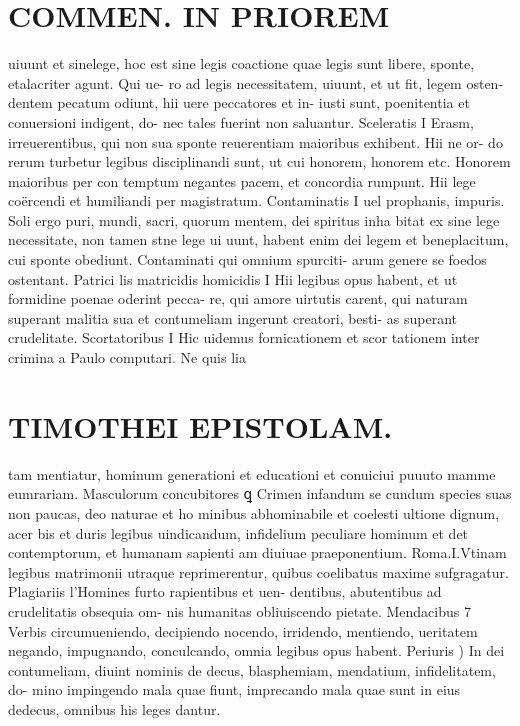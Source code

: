 \documentclass{article}
\begin{document}
\begin{pages}
\section*{COMMEN. IN PRIOREM }
\marginpar{[ p.20 ]}\pstart uiuunt et sinelege, hoc est sine legis coactione quae legis sunt libere, sponte, etalacriter agunt. Qui ue- ro ad legis necessitatem, uiuunt, et ut fit, legem osten- dentem pecatum odiunt, hii uere peccatores et in- iusti sunt, poenitentia et conuersioni indigent, do- nec tales fuerint non saluantur.  \pend\pstart Sceleratis I Erasm, irreuerentibus, qui non sua sponte reuerentiam maioribus exhibent. Hii ne or- do rerum turbetur legibus disciplinandi sunt, ut cui honorem, honorem etc. Honorem maioribus per con temptum negantes pacem, et concordia rumpunt. Hii lege coërcendi et humiliandi per magistratum.  \pend\pstart Contaminatis I uel prophanis, impuris. Soli ergo puri, mundi, sacri, quorum mentem, dei spiritus inha bitat ex sine lege necessitate, non tamen stne lege ui uunt, habent enim dei legem et beneplacitum, cui sponte obediunt. Contaminati qui omnium spurciti- arum genere se foedos ostentant.  \pend\pstart Patrici lis matricidis homicidis I Hii legibus opus habent, et ut formidine poenae oderint pecca- re, qui amore uirtutis carent, qui naturam superant malitia sua et contumeliam ingerunt creatori, besti- as superant crudelitate.  \pend\pstart Scortatoribus I Hic uidemus fornicationem et scor tationem inter crimina a Paulo computari. Ne quis lia  \pend
\section*{TIMOTHEI EPISTOLAM. }
\marginpar{[ p.21 ]}\pstart tam mentiatur, hominum generationi et educationi et conuiciui puuuto mamme eumrariam.  \pend\pstart Masculorum concubitores ꝗ Crimen infandum se cundum species suas non paucas, deo naturae et ho minibus abhominabile et coelesti ultione dignum, acer bis et duris legibus uindicandum, infidelium peculiare hominum et det contemptorum, et humanam sapienti am diuiuae praeponentium. Roma.I.Vtinam legibus matrimonii utraque reprimerentur, quibus coelibatus maxime sufgragatur.  \pend\pstart Plagiariis l’Homines furto rapientibus et uen- dentibus, abutentibus ad crudelitatis obsequia om- nis humanitas obliuiscendo pietate.  \pend\pstart Mendacibus 7 Verbis circumueniendo, decipiendo nocendo, irridendo, mentiendo, ueritatem negando, impugnando, conculcando, omnia legibus opus habent. Periuris ) In dei contumeliam, diuint nominis de decus, blasphemiam, mendatium, infidelitatem, do- mino impingendo mala quae fiunt, imprecando mala quae sunt in eius dedecus, omnibus his leges dantur.  \pend
{}
{}

\end{pages}
\end{document}

